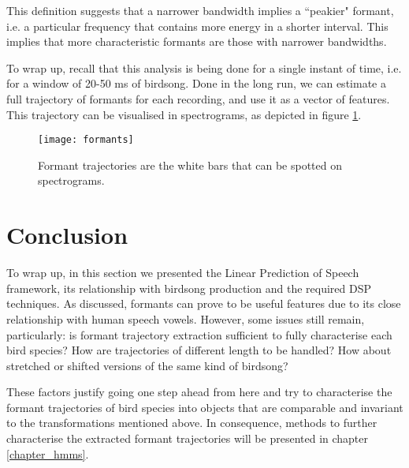 \documentclass[../main.tex]{subfiles}
\begin{document}
\par This definition suggests that a narrower bandwidth implies a ``peakier" formant, i.e. a particular frequency that contains more energy in a shorter interval. This implies that more characteristic formants are those with narrower bandwidths.
\par To wrap up, recall that this analysis is being done for a single instant of time, i.e. for a window of 20-50 ms of birdsong. Done in the long run, we can estimate a full trajectory of formants for each recording, and use it as a vector of features. This trajectory can be visualised in spectrograms, as depicted in figure \ref{fig_specformants}.
\begin{figure}[t]
\centering
\texttt{[image: formants]}
\caption{Formant trajectories are the white bars that can be spotted on spectrograms. }
\label{fig_specformants}
\end{figure}


\section{Conclusion} \label{section_form_estimation}
To wrap up, in this section we presented the Linear Prediction of Speech framework, its relationship with birdsong production and the required DSP techniques. As discussed, formants can prove to be useful features due to its close relationship with human speech vowels. However, some issues still remain, particularly: is formant trajectory extraction sufficient to fully characterise each bird species? How are trajectories of different length to be handled? How about stretched or shifted versions of the same kind of birdsong? 
\par These factors justify going one step ahead from here and try to characterise the formant trajectories of bird species into objects that are comparable and invariant to the transformations mentioned above. In consequence, methods to further characterise the extracted formant trajectories will be presented in chapter \ref{chapter_hmms}. 
    
\end{document}
